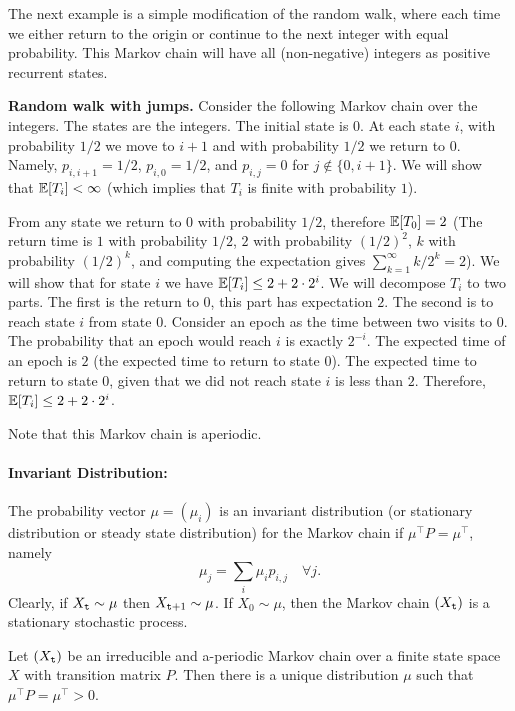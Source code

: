 The next example is a simple modification of the random walk, where each time we either return to the origin or continue to the next integer with equal probability. 
This Markov chain will have all (non-negative) integers as positive recurrent states.

\begin{example}
{\bf Random walk with jumps.}
%
Consider the following Markov chain over the integers. The states
are the integers. The initial state is $0$. At each state $i$, with
probability $1/2$ we move to $i+1$ and with probability $1/2$ we
return to $0$. Namely, $p_{i,i+1}=1/2$, $p_{i,0}=1/2$, and $p_{i,j}
=0$ for $j \not\in \{0,i+ 1\}$. We will show that $\mathbb{E}[T_i]<\infty$
(which implies that $T_i$ is finite with probability $1$).

From any state we return to $0$ with probability $1/2$, therefore
$\mathbb{E}[T_0]=2$ (The return time is $1$ with probability $1/2$, $2$ with probability $(1/2)^2$, $k$ with probability $(1/2)^k$, and computing the expectation gives $\sum_{k=1}^\infty k/2^k = 2$). We will show that for state $i$ we have
$\mathbb{E}[T_i]\leq2+2\cdot 2^{i}$. We will decompose $T_i$ to two parts. The
first is the return to $0$, this part has expectation $2$. The
second is to reach state $i$ from state $0$. Consider an epoch as
the time between two visits to $0$. The probability that an epoch
would reach $i$ is exactly $2^{-i}$. The expected time of an epoch
is $2$ (the expected time to return to state $0$). The expected time
to return to state $0$, given that we did not reach state $i$ is
less than $2$. Therefore, $\mathbb{E}[T_i]\leq 2+2\cdot 2^{i}$.

Note that this Markov chain is aperiodic.
\end{example}



\paragraph{Invariant Distribution:} %
The probability vector $\mu  = ({\mu_i})$ is an invariant
distribution (or stationary distribution or steady state
distribution) for the Markov chain if $\mu^\top P = \mu^\top$,
namely
\[{\mu_j} = \sum_i {{\mu_i}} {p_{i,j}}\quad \forall j.\]
Clearly, if ${X_{\tt t}} \sim \mu $ then ${X_{{\tt t} + 1}} \sim \mu
$. If ${X_0} \sim \mu $, then the Markov chain $({X_{\tt t}})$ is a
stationary stochastic process.


\begin{theorem}
\label{Thm:MC-stationary}
 Let $({X_{\tt t}})$ be an irreducible and
a-periodic Markov chain over a finite state space $X$ with
transition matrix $P$. Then there is a unique distribution $\mu$
such that $\mu^\top P = \mu^\top >0$.
\end{theorem}

